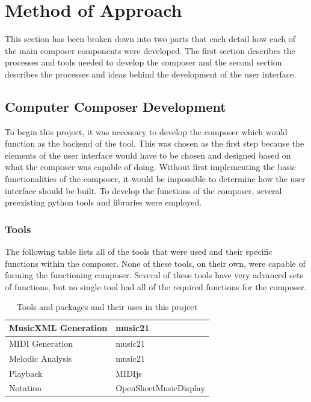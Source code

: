 \chapter{Method of Approach} 
\label{ch:methodofapproach}

This section has been broken down into two parts that each detail how each of the main composer components were developed.  The first section describes the processes and tools needed to develop the composer and the second section describes the processes and ideas behind the development of the user interface.

\section{Computer Composer Development}
\label{sec:computercomposerdevelopment}

To begin this project, it was necessary to develop the composer which would function as the backend of the tool.  This was chosen as the first step because the elements of the user interface would have to be chosen and designed based on what the composer was capable of doing.  Without first implementing the basic functionalities of the composer, it would be impossible to determine how the user interface should be built.  To develop the functions of the composer, several preexisting python tools and libraries were employed.

\vspace{\baselineskip}

\subsection{Tools}
\label{subsec:tools}

The following table lists all of the tools that were used and their specific functions within the composer.  None of these tools, on their own, were capable of forming the functioning composer.  Several of these tools have very advanced sets of functions, but no single tool had all of the required functions for the composer.

\begin{table}[!htbp]
	\centering
	\caption{Tools and packages and their uses in this project}
	\begin{tabular}{|l|l|}
		\hline
		MusicXML Generation & music21 \\ \hline
		MIDI Generation & music21 \\ \hline
		Melodic Analysis & music21 \\ \hline
		Playback & MIDIjs \\ \hline
		Notation & OpenSheetMusicDisplay \\ \hline
	\end{tabular}
\end{table}

